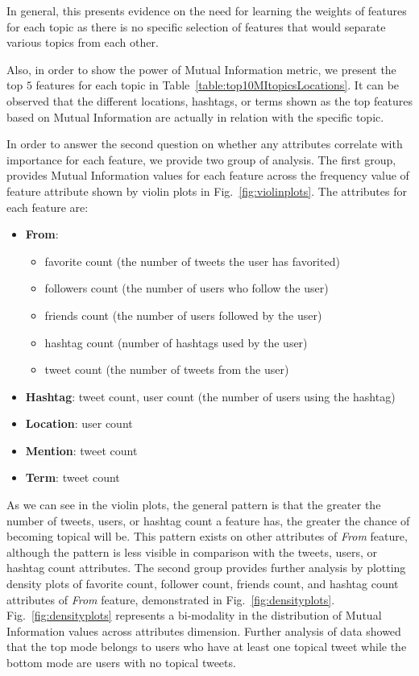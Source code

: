 In general, this presents evidence on the need for learning the weights of features for each topic as there is no specific selection of features that would separate various topics from each other.

Also, in order to show the power of Mutual Information metric, we present the top $5$ features for each topic in Table~\ref{table:top10MItopicsLocations}. It can be observed that the different locations, hashtags, or terms shown as the top features based on Mutual Information are actually in relation with the specific topic.

In order to answer the second question on whether any attributes correlate with importance for each feature, we provide two group of analysis. The first group, provides Mutual Information values for each feature across the frequency value of feature attribute shown by violin plots in Fig.~\ref{fig:violinplots}. The attributes for each feature are:

\begin{itemize}
\item \textbf{From}: 
\begin{itemize}
\item favorite count (the number of tweets the user has favorited)
\item followers count (the number of users who follow the user)
\item friends count (the number of users followed by the user)
\item hashtag count (number of hashtags used by the user)
\item tweet count (the number of tweets from the user)
 \end{itemize}
\item \textbf{Hashtag}: tweet count, user count (the number of users using the hashtag)
\item \textbf{Location}: user count
\item \textbf{Mention}: tweet count
\item \textbf{Term}: tweet count
\end{itemize}

As we can see in the violin plots, the general pattern is that the greater the number of tweets, users, or hashtag count a feature has, the greater the chance of becoming topical will be. This pattern exists on other attributes of \textit{From} feature, although the pattern is less visible in comparison with the tweets, users, or hashtag count attributes. 
The second group provides further analysis by plotting density plots of favorite count, follower count, friends count, and hashtag count attributes of \textit{From} feature, demonstrated in Fig.~\ref{fig:densityplots}. Fig.~\ref{fig:densityplots} represents a bi-modality in the distribution of Mutual Information values across attributes dimension. Further analysis of data showed that the top mode belongs to users who have at least one topical tweet while the bottom mode are users with no topical tweets.
